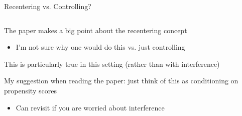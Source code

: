 \documentclass[notes,11pt, aspectratio=169]{beamer}
\newenvironment{wideitemize}{\itemize\addtolength{\itemsep}{10pt}}{\enditemize}
\begin{document}
\begin{frame}{Recentering vs. Controlling?}
\begin{columns}[T] %
\begin{column}{.9\textwidth}
  \begin{wideitemize}
  \item The paper makes a big point about the recentering concept
    \begin{itemize}
    \item I'm not sure why one would do this vs. just controlling
    \end{itemize}
  \item This is particularly true in this setting (rather than with
    interference)
  \item My suggestion when reading the paper: just think of this as
    conditioning on propensity scores
    \begin{itemize}
    \item Can revisit if you are worried about interference
    \end{itemize}
  \end{wideitemize}
\end{column}%
\hfill%
\begin{column}{.25\textwidth}
\end{column}%
\end{columns}
\end{frame}
\end{document}
